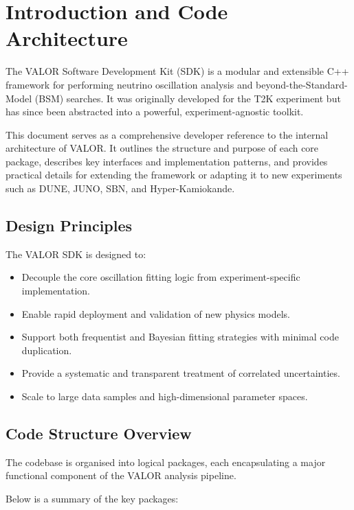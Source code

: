 \section{Introduction and Code Architecture}

The VALOR Software Development Kit (SDK) is a modular and extensible C++ framework for performing neutrino oscillation analysis and beyond-the-Standard-Model (BSM) searches. It was originally developed for the T2K experiment but has since been abstracted into a powerful, experiment-agnostic toolkit.

This document serves as a comprehensive developer reference to the internal architecture of VALOR. It outlines the structure and purpose of each core package, describes key interfaces and implementation patterns, and provides practical details for extending the framework or adapting it to new experiments such as DUNE, JUNO, SBN, and Hyper-Kamiokande.

\subsection{Design Principles}

The VALOR SDK is designed to:
\begin{itemize}
  \item Decouple the core oscillation fitting logic from experiment-specific implementation.
  \item Enable rapid deployment and validation of new physics models.
  \item Support both frequentist and Bayesian fitting strategies with minimal code duplication.
  \item Provide a systematic and transparent treatment of correlated uncertainties.
  \item Scale to large data samples and high-dimensional parameter spaces.
\end{itemize}

\subsection{Code Structure Overview}

The codebase is organised into logical packages, each encapsulating a major functional component of the VALOR analysis pipeline.

Below is a summary of the key packages:

